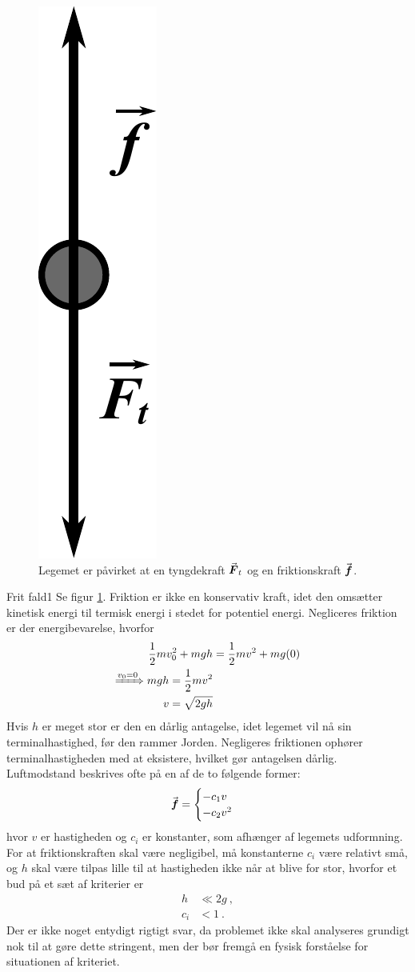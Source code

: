 %
%
\begin{figure}
	\centering
	\includegraphics[width=.08\textwidth]{Analytisk-Mekanik/FritFald.pdf}
	\caption{Legemet er påvirket at en tyngdekraft ${\vec{\boldsymbol{F}}}_t$ og en friktionskraft ${\vec{\boldsymbol{f}}}$.}
	\label{fig:FritFald}
\end{figure}
%
%
\begin{opgave}{Frit fald}{1}
\opg Se figur \ref{fig:FritFald}.
\opg Friktion er ikke en konservativ kraft, idet den omsætter kinetisk energi til termisk energi i stedet for potentiel energi.
\opg Negliceres friktion er der energibevarelse, hvorfor
\begin{align*}
	\frac{1}{2}mv_0^2 + mgh &= \frac{1}{2}mv^2 + mg(0) \\
	\xRightarrow{v_0=0} mgh = \frac{1}{2}mv^2 \\
	v = \sqrt{2gh}
\end{align*}
\opg Hvis $h$ er meget stor er den en dårlig antagelse, idet legemet vil nå sin terminalhastighed, før den rammer Jorden. Negligeres friktionen ophører terminalhastigheden med at eksistere, hvilket gør antagelsen dårlig. \\
Luftmodstand beskrives ofte på en af de to følgende former:
\begin{align*}
	{\vec{\boldsymbol{f}}} =
		\begin{cases}
			-c_1v \\
			-c_2v^2
		\end{cases}
\end{align*}
hvor $v$ er hastigheden og $c_i$ er konstanter, som afhænger af legemets udformning. For at friktionskraften skal være negligibel, må konstanterne $c_i$ være relativt små, og $h$ skal være tilpas lille til at hastigheden ikke når at blive for stor, hvorfor et bud på et sæt af kriterier er
\begin{align*}
	h &\ll 2g \: ,\\
	c_i &< 1 \: .
\end{align*}
Der er ikke noget entydigt rigtigt svar, da problemet ikke skal analyseres grundigt nok til at gøre dette stringent, men der bør fremgå en fysisk forståelse for situationen af kriteriet.
\end{opgave}
